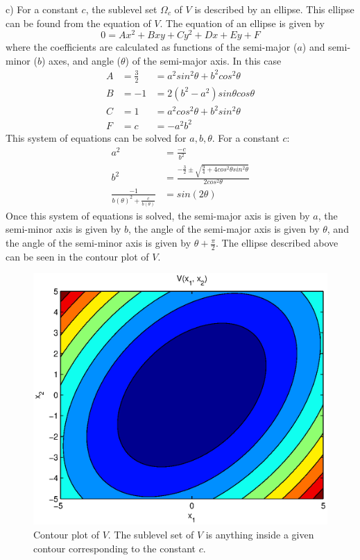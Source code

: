 \documentclass[paper=a4, fontsize=11pt]{scrartcl} %
\numberwithin{equation}{section} %
\numberwithin{figure}{section} %
\numberwithin{table}{section} %
\begin{document}
c) For a constant $c$, the sublevel set $\Omega_c$ of $V$ is described by an ellipse. This ellipse can be found from the equation of $V$. The equation of an ellipse is given by 
\begin{equation}
0=Ax^2+Bxy+Cy^2+Dx+Ey+F
\end{equation}
where the coefficients are calculated as functions of the semi-major ($a$) and semi-minor ($b$) axes, and angle ($\theta$) of the semi-major axis. In this case
\begin{align}
A &= \frac{3}{2} &= a^2sin^2\theta + b^2cos^2\theta \\
B &= -1 &= 2(b^2-a^2)sin\theta cos\theta \\
C &= 1 &= a^2cos^2\theta + b^2sin^2\theta \\
F &= c &= -a^2b^2
\end{align}
This system of equations can be solved for $a, b, \theta$. For a constant $c$:
\begin{align}
a^2 &= \frac{-c}{b^2} \\
b^2 &= \frac{-\frac{3}{2} \pm \sqrt{\frac{9}{4}+4cos^2\theta sin^2\theta}}{2cos^2\theta} \\
\frac{-1}{b(\theta)^2 + \frac{c}{b(\theta)}} &= sin(2\theta)
\end{align}
Once this system of equations is solved, the semi-major axis is given by $a$, the semi-minor axis is given by $b$, the angle of the semi-major axis is given by $\theta$, and the angle of the semi-minor axis is given by $\theta+\frac{\pi}{2}$.
The ellipse described above can be seen in the contour plot of $V$.
\begin{figure}[h!]
\label{contour1}
\centering
\includegraphics[scale=0.75]{prob3_ellipse}
\caption{Contour plot of $V$. The sublevel set of $V$ is anything inside a given contour corresponding to the constant $c$.}
\end{figure} 
\end{document}
